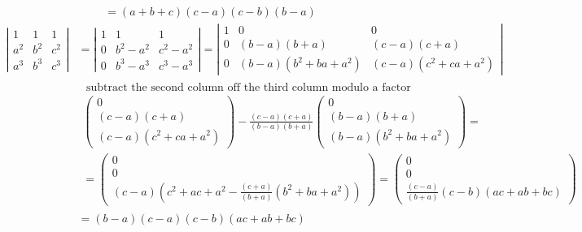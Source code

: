 \documentclass[twoside]{amsart}
\theoremstyle{plain}
\theoremstyle{definition}
\begin{document}
\begin{enumerate}
\[\begin{aligned}
    & = (a+b+c)(c-a)(c-b)(b-a)
  \end{aligned}
  \]
\[
\begin{aligned}
\left| \begin{matrix} 1 & 1 & 1 \\ a^2 & b^2 & c^2 \\ a^3 & b^3 & c^3 \end{matrix} \right| & = \left| \begin{matrix} 1 & 1 & 1 \\ 0 & b^2 -a^2 & c^2 -a^2 \\ 0 & b^3 -a^3 & c^3 -a^3 \end{matrix} \right| = \left| \begin{matrix} 1 & 0 & 0 \\ 0 & (b-a)(b+a) & (c-a)(c+a) \\ 0 & (b-a)(b^2 +ba +a^2) & (c-a)(c^2 +ca +a^2) \end{matrix} \right|  \\
& \begin{gathered}
  \text{ subtract the second column off the third column modulo a factor } \\
  \left( \begin{matrix} 0 \\ (c-a)(c+a) \\ (c-a)(c^2 +ca +a^2) \end{matrix} \right) - \frac{ (c-a)(c+a)}{(b-a)(b+a)} \left( \begin{matrix} 0 \\ (b-a)(b+a) \\ (b-a)(b^2 +ba +a^2) \end{matrix} \right) = \\ 
  = \left( \begin{matrix} 0 \\ 0 \\ (c-a)(c^2 + ac + a^2 - \frac{ (c+a)}{(b+a)} (b^2 +ba +a^2) ) \end{matrix} \right) = \left( \begin{matrix} 0 \\ 0 \\ \frac{ (c-a)}{ (b+a)} (c-b)(ac +ab +bc) \end{matrix} \right) 
\end{gathered} \\
& = (b-a)(c-a)(c-b)(ac+ab+bc)
\end{aligned}
\]
\end{enumerate}
\end{document}
